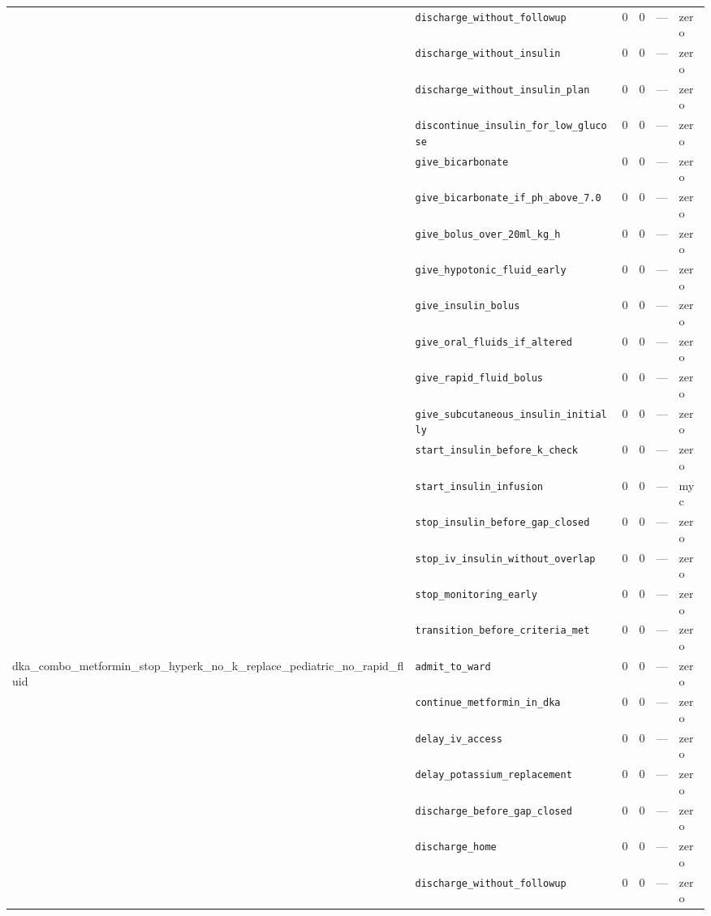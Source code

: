 \begin{table}[ht]
\begin{tabular}{llrrrl}
 & \texttt{discharge\_without\_followup} & 0 & 0 & — & zero \\
 & \texttt{discharge\_without\_insulin} & 0 & 0 & — & zero \\
 & \texttt{discharge\_without\_insulin\_plan} & 0 & 0 & — & zero \\
 & \texttt{discontinue\_insulin\_for\_low\_glucose} & 0 & 0 & — & zero \\
 & \texttt{give\_bicarbonate} & 0 & 0 & — & zero \\
 & \texttt{give\_bicarbonate\_if\_ph\_above\_7.0} & 0 & 0 & — & zero \\
 & \texttt{give\_bolus\_over\_20ml\_kg\_h} & 0 & 0 & — & zero \\
 & \texttt{give\_hypotonic\_fluid\_early} & 0 & 0 & — & zero \\
 & \texttt{give\_insulin\_bolus} & 0 & 0 & — & zero \\
 & \texttt{give\_oral\_fluids\_if\_altered} & 0 & 0 & — & zero \\
 & \texttt{give\_rapid\_fluid\_bolus} & 0 & 0 & — & zero \\
 & \texttt{give\_subcutaneous\_insulin\_initially} & 0 & 0 & — & zero \\
 & \texttt{start\_insulin\_before\_k\_check} & 0 & 0 & — & zero \\
 & \texttt{start\_insulin\_infusion} & 0 & 0 & — & myc \\
 & \texttt{stop\_insulin\_before\_gap\_closed} & 0 & 0 & — & zero \\
 & \texttt{stop\_iv\_insulin\_without\_overlap} & 0 & 0 & — & zero \\
 & \texttt{stop\_monitoring\_early} & 0 & 0 & — & zero \\
 & \texttt{transition\_before\_criteria\_met} & 0 & 0 & — & zero \\
\midrule
dka\_combo\_metformin\_stop\_hyperk\_no\_k\_replace\_pediatric\_no\_rapid\_fluid & \texttt{admit\_to\_ward} & 0 & 0 & — & zero \\
 & \texttt{continue\_metformin\_in\_dka} & 0 & 0 & — & zero \\
 & \texttt{delay\_iv\_access} & 0 & 0 & — & zero \\
 & \texttt{delay\_potassium\_replacement} & 0 & 0 & — & zero \\
 & \texttt{discharge\_before\_gap\_closed} & 0 & 0 & — & zero \\
 & \texttt{discharge\_home} & 0 & 0 & — & zero \\
 & \texttt{discharge\_without\_followup} & 0 & 0 & — & zero \\

\end{tabular}
\end{table}
